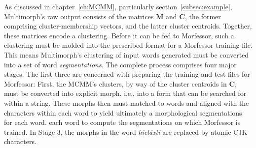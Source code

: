As discussed in chapter~\ref{ch:MCMM}, particularly section~\ref{subsec:example}, Multimorph's raw output consists of the matrices $\mathbf{M}$ and $\mathbf{C}$, the former comprising cluster-membership vectors, and the latter cluster centroids. 
Together, these matrices encode a clustering. 
Before it can be fed to Morfessor, such a clustering must be molded 
into the prescribed format for a Morfessor training file. This means 
Multimorph's clustering of input words generated must be 
converted into a set of word \emph{segmentations}.
The complete process comprises
four major stages. The first three are concerned with preparing the training and test files for Morfessor: First, the MCMM's clusters, by way of the cluster centroids in $\mathbf{C}$, must be converted into explicit morph, i.e., into a form that can be searched for within a string. These morphs then must matched to words and aligned with the characters within each word to yield ultimately a morphological segmentations for each word. 
 each word to compute the segmentations on which Morfessor is trained.  In Stage 3, the morphs in the word \textit{hicl\'{a}xti} are replaced by atomic CJK characters.

